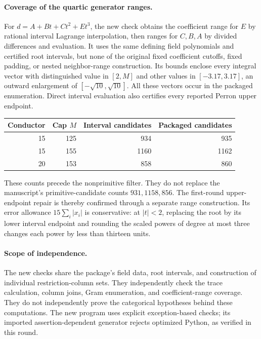 \documentclass[11pt,a4paper]{article}
\begin{document}
\paragraph{Coverage of the quartic generator ranges.}
For $d=A+Bt+Ct^2+Et^3$, the new check obtains the coefficient range for
$E$ by rational interval Lagrange interpolation, then ranges for
$C,B,A$ by divided differences and evaluation. It uses the same
defining field polynomials and certified root intervals, but none of
the original fixed coefficient cutoffs, fixed padding, or nested
neighbor-range construction. Its bounds enclose every integral vector
with distinguished value in $[2,M]$ and other values in
$[-3.17,3.17]$, an outward enlargement of $[-\sqrt{10},\sqrt{10}]$.
All these vectors occur in the packaged enumeration. Direct interval
evaluation also certifies every reported Perron upper endpoint.

\begin{center}
\begin{tabular}{rrrr}
\toprule
Conductor&Cap $M$&Interval candidates&Packaged candidates\\\midrule
15&125&934&935\\
15&155&1160&1162\\
20&153&858&860\\\bottomrule
\end{tabular}
\end{center}
These counts precede the nonprimitive filter. They do not replace the
manuscript's primitive-candidate counts $931,1158,856$.
The first-round upper-endpoint repair is thereby confirmed through a
separate range construction. Its error allowance
$15\sum_i|x_i|$ is conservative: at $|t|<2$, replacing the root by
its lower interval endpoint and rounding the scaled powers of degree
at most three changes each power by less than thirteen units.

\paragraph{Scope of independence.}
The new checks share the package's field data, root intervals, and
construction of individual restriction-column sets. They independently
check the trace calculation, column joins, Gram enumeration, and
coefficient-range coverage. They do not independently prove the
categorical hypotheses behind these computations. The new program
uses explicit exception-based checks; its imported assertion-dependent
generator rejects optimized Python, as verified in this round.
\end{document}
